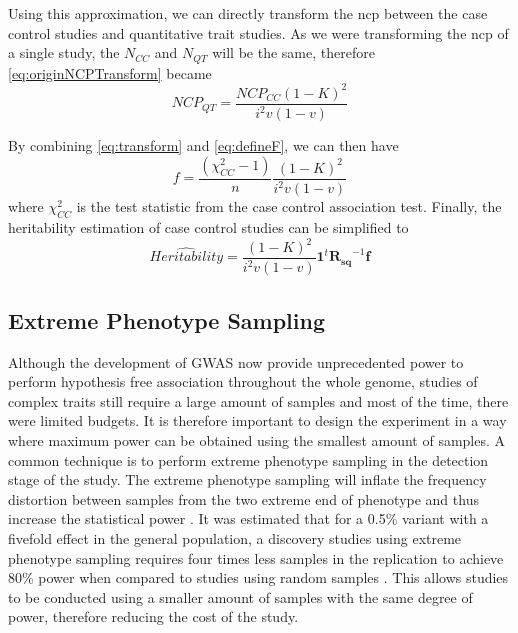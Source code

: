 			Using this approximation, we can directly transform the \gls{ncp} between the case control studies and quantitative trait studies.
			As we were transforming the \gls{ncp} of a single study, the $N_{CC}$ and $N_{QT}$ will be the same, therefore \cref{eq:originNCPTransform} became
			\begin{equation}
			NCP_{QT} = \frac{NCP_{CC}(1-K)^2}{i^2v(1-v)}
			\label{eq:transform}
			\end{equation}
			
			By combining \cref{eq:transform} and \cref{eq:defineF}, we can then have
			\begin{equation}
			f = \frac{(\chi^2_{CC}-1)}{n}\frac{(1-K)^2}{i^2v(1-v)}
			\end{equation}
			where $\chi^2_{CC}$ is the test statistic from the case control association test.
			Finally, the heritability estimation of case control studies can be simplified to 
			\begin{equation}
			\hat{Heritability} =\frac{(1-K)^2}{i^2v(1-v)} \boldsymbol{1}^t\boldsymbol{R_{sq}}^{-1}\boldsymbol{f}
			\label{eq:caseControlHerit}
			\end{equation}
			
		\subsection{Extreme Phenotype Sampling}
			Although the development of \gls{GWAS} now provide unprecedented power to perform hypothesis free association throughout the whole genome, studies of complex traits still require a large amount of samples and most of the time, there were limited budgets.
			It is therefore important to design the experiment in a way where maximum power can be obtained using the smallest amount of samples.
			A common technique is to perform extreme phenotype sampling in the detection stage of the study.
			The extreme phenotype sampling will inflate the frequency distortion between samples from the two extreme end of phenotype and thus increase the statistical power \citep{Guey2011}.
			It was estimated that for a 0.5\% variant with a fivefold effect in the general population, a discovery studies using extreme phenotype sampling requires four times less samples in the replication to achieve 80\% power when compared to studies using random samples \citep{Guey2011}.
			This allows studies to be conducted using a smaller amount of samples with the same degree of power, therefore reducing the cost of the study.
			
